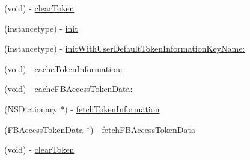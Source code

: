 \begin{DoxyCompactItemize}
\item 
(void) -\/ \hyperlink{interfaceFBSessionTokenCachingStrategy_a4cc3c2711517839cecad4b3047a28f85}{clear\+Token}
\item 
(instancetype) -\/ \hyperlink{interfaceFBSessionTokenCachingStrategy_adf7a7150fecc4aab6dea9e7c0b64760b}{init}
\item 
(instancetype) -\/ \hyperlink{interfaceFBSessionTokenCachingStrategy_a450317ada46fcbed38bf0edf0d0cede9}{init\+With\+User\+Default\+Token\+Information\+Key\+Name\+:}
\item 
(void) -\/ \hyperlink{interfaceFBSessionTokenCachingStrategy_a89929f2fc1d8d29bb1add6e607d7c864}{cache\+Token\+Information\+:}
\item 
(void) -\/ \hyperlink{interfaceFBSessionTokenCachingStrategy_a35d668a867fcc88c491bb8d0c815c9f9}{cache\+F\+B\+Access\+Token\+Data\+:}
\item 
(N\+S\+Dictionary $\ast$) -\/ \hyperlink{interfaceFBSessionTokenCachingStrategy_a08b75ac08ae3b7a1ad769f3b026f857c}{fetch\+Token\+Information}
\item 
(\hyperlink{interfaceFBAccessTokenData}{F\+B\+Access\+Token\+Data} $\ast$) -\/ \hyperlink{interfaceFBSessionTokenCachingStrategy_a7378a3d9006864d343e086bbfbe66948}{fetch\+F\+B\+Access\+Token\+Data}
\item 
(void) -\/ \hyperlink{interfaceFBSessionTokenCachingStrategy_a4cc3c2711517839cecad4b3047a28f85}{clear\+Token}
\end{DoxyCompactItemize}
